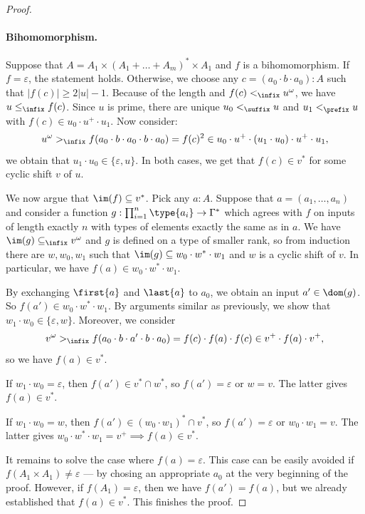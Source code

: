 \begin{proof}
    \paragraph{Bihomomorphism.} Suppose that $A = A_1 \times (A_1 + \dots + A_m)^* \times A_1$ and $f$ is a bihomomorphism. If $f = \varepsilon$, the statement holds. Otherwise, we choose any $c = (a_0 \cdot b \cdot a_0) : A$ such that $|f(c)| \geq 2|u|-1$. Because of the length and $f(c) <_\infix u^\omega$, we have $u \leq_\infix f(c)$. Since $u$ is prime, there are unique $u_0 <_\suffix u$ and $u_1 <_\prefix u$ with $f(c) \in u_0 \cdot u^+ \cdot u_1$. 
    Now consider: 
    \[
        u^\omega >_\infix f(a_0 \cdot b \cdot a_0 \cdot b \cdot a_0) = f(c)^2 \in u_0 \cdot u^+ \cdot (u_1 \cdot u_0) \cdot u^+ \cdot u_1,
    \]
    we obtain that $u_1 \cdot u_0 \in \{\varepsilon, u\}$. In both cases, we get that $f(c) \in v^*$ for some cyclic shift $v$ of $u$.

    We now argue that $\im(f) \subseteq v^*$. Pick any $a : A$. Suppose that $a = (a_1, \dots, a_n)$ and consider a function $g : \prod_{i=1}^n \type{a_i} \to \Gamma^*$ which agrees with $f$ on inputs of length exactly $n$ with types of elements exactly the same as in $a$. We have $\im(g) \subseteq_\infix v^\omega$ and $g$ is defined on a type of smaller rank, so from induction there are $w, w_0, w_1$ such that $\im(g) \subseteq w_0 \cdot w^* \cdot w_1$ and $w$ is a cyclic shift of $v$. In particular, we have $f(a) \in w_0 \cdot w^* \cdot w_1$.

    By exchanging $\first{a}$ and $\last{a}$ to $a_0$, we obtain an input $a' \in \dom(g)$. So $f(a') \in w_0 \cdot w^* \cdot w_1$. By arguments similar as previously, we show that $w_1 \cdot w_0 \in \{\varepsilon, w\}$. Moreover, we consider 
    \[
        v^\omega >_\infix f(a_0 \cdot b \cdot a' \cdot b \cdot a_0) = f(c) \cdot f(a) \cdot f(c) \in v^+ \cdot f(a) \cdot v^+,
    \]
    so we have $f(a) \in v^*$.

    If $w_1 \cdot w_0 = \varepsilon$, then $f(a') \in v^* \cap w^*$, so $f(a') = \varepsilon$ or $w = v$. The latter gives $f(a) \in v^*$.

    If $w_1 \cdot w_0 = w$, then $f(a') \in (w_0 \cdot w_1)^* \cap v^*$, so $f(a') = \varepsilon$ or $w_0 \cdot w_1 = v$. The latter gives $w_0 \cdot w^* \cdot w_1 = v^+ \implies f(a) \in v^*$.

    It remains to solve the case where $f(a) = \varepsilon$. This case can be easily avoided if $f(A_1 \times A_1) \neq \varepsilon$ --- by chosing an appropriate $a_0$ at the very beginning of the proof. However, if $f(A_1) = \varepsilon$, then we have $f(a') = f(a)$, but we already established that $f(a) \in v^*$. This finishes the proof.
\end{proof}

